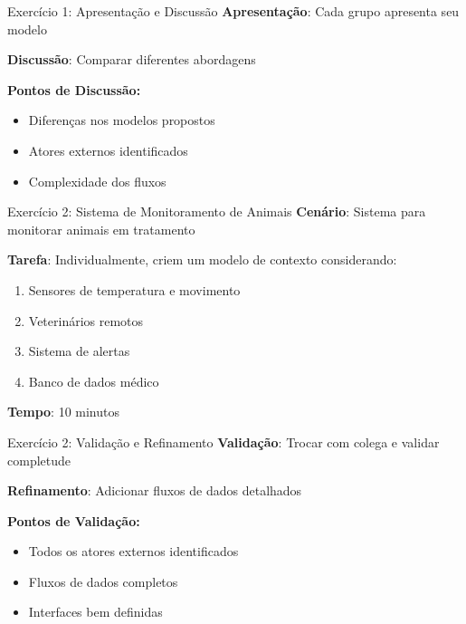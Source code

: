 \documentclass[aspectratio=169]{beamer}
\begin{document}
\begin{frame}{Exercício 1: Apresentação e Discussão}
\textbf{Apresentação}: Cada grupo apresenta seu modelo

\vspace{0.5cm}
\textbf{Discussão}: Comparar diferentes abordagens

\vspace{0.5cm}
\textbf{Pontos de Discussão:}
\begin{itemize}
\item Diferenças nos modelos propostos
\item Atores externos identificados
\item Complexidade dos fluxos
\end{itemize}
\end{frame}

\begin{frame}{Exercício 2: Sistema de Monitoramento de Animais}
\textbf{Cenário}: Sistema para monitorar animais em tratamento

\textbf{Tarefa}: Individualmente, criem um modelo de contexto considerando:
\begin{enumerate}
\item Sensores de temperatura e movimento
\item Veterinários remotos
\item Sistema de alertas
\item Banco de dados médico
\end{enumerate}

\vspace{0.5cm}
\textbf{Tempo}: 10 minutos
\end{frame}

\begin{frame}{Exercício 2: Validação e Refinamento}
\textbf{Validação}: Trocar com colega e validar completude

\vspace{0.5cm}
\textbf{Refinamento}: Adicionar fluxos de dados detalhados

\vspace{0.5cm}
\textbf{Pontos de Validação:}
\begin{itemize}
\item Todos os atores externos identificados
\item Fluxos de dados completos
\item Interfaces bem definidas
\end{itemize}
\end{frame}
\end{document}
